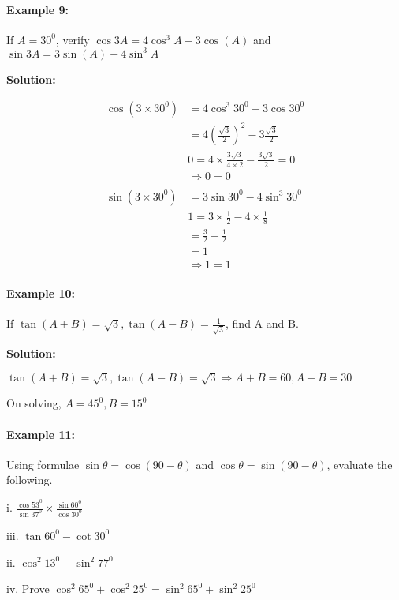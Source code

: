 \documentclass{article}
\begin{document}
\paragraph{Example 9:}
If $A = 30^{0}$, verify $\cos3A = 4\cos^{3}A - 3 \cos(A) $ and $\sin3A = 3\sin(A) - 4\sin^{3}A$

{\scriptsize \textbf{Solution:}}

\[
  \begin{aligned}
    \cos(3 \times 30^{0}) &= 4\cos^{3}30^{0} - 3\cos30^{0} \\
                         &= 4\left(\frac{\sqrt{3}}{2}\right)^{2} - 3\frac{\sqrt{3}}{2} \\
                         & 0 = 4 \times \frac{3\sqrt{3}}{4\times2} - \frac{3\sqrt{3}}{2} = 0 \\
                         &\Rightarrow 0 = 0 \\
    \\
    \sin(3 \times 30^{0}) &= 3\sin30^{0} - 4\sin^{3}30^{0} \\
                         & 1 = 3 \times \frac{1}{2} - 4 \times \frac{1}{8} \\
                         & = \frac{3}{2} - \frac{1}{2} \\
                         & = 1 \\
                         &\Rightarrow 1 = 1
  \end{aligned}
\]

\paragraph{Example 10:}
If $\tan(A+B) = \sqrt{3}, \tan(A-B)=\frac{1}{\sqrt{3}}$, find A and B.

{\scriptsize \textbf{Solution:}}

$\tan(A+B) = \sqrt{3}, \tan(A-B) = \sqrt{3} \Rightarrow A + B = 60, A - B = 30$

On solving, $A = 45^{0}, B = 15^{0}$

\paragraph{Example 11:}
Using formulae $\sin\theta = \cos(90-\theta)$ and $\cos\theta = \sin(90-\theta)$, evaluate the following.

\begin{enumerate}
        \begin{paracol}{2}
          \item[i.] $\frac{\cos53^{0}}{\sin37^{0}} \times \frac{\sin60^{0}}{\cos30^{0}}$
          \item[iii.] $\tan60^{0} - \cot30^{0}$
          \switchcolumn
          \item[ii.] $\cos^{2}13^{0} - \sin^{2}77^{0}$
          \item[iv.] Prove $\cos^{2}65^{0} + \cos^{2}25^{0} = \sin^{2}65^{0} + \sin^{2}25^{0}$
          \switchcolumn
        \end{paracol}
\end{enumerate}
\end{document}
